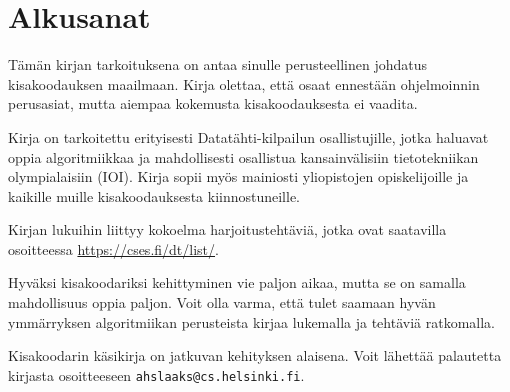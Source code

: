 \chapter*{Alkusanat}

Tämän kirjan tarkoituksena on antaa sinulle
perusteellinen johdatus kisakoodauksen maailmaan.
Kirja olettaa, että osaat ennestään
ohjelmoinnin perusasiat, mutta aiempaa kokemusta
kisakoodauksesta ei vaadita.

Kirja on tarkoitettu erityisesti
Datatähti-kilpailun osallistujille,
jotka haluavat oppia algoritmiikkaa
ja mahdollisesti osallistua kansainvälisiin
tietotekniikan olympialaisiin (IOI).
Kirja sopii myös mainiosti 
yliopistojen opiskelijoille ja
kaikille muille kisakoodauksesta kiinnostuneille.

Kirjan lukuihin liittyy kokoelma harjoitustehtäviä,
jotka ovat saatavilla osoitteessa \url{https://cses.fi/dt/list/}.

Hyväksi kisakoodariksi kehittyminen vie paljon aikaa,
mutta se on samalla mahdollisuus oppia paljon.
Voit olla varma, että tulet saamaan hyvän ymmärryksen
algoritmiikan perusteista
kirjaa lukemalla ja tehtäviä ratkomalla.

Kisakoodarin käsikirja on jatkuvan kehityksen alaisena.
Voit lähettää palautetta kirjasta
osoitteeseen
\texttt{ahslaaks@cs.helsinki.fi}.
